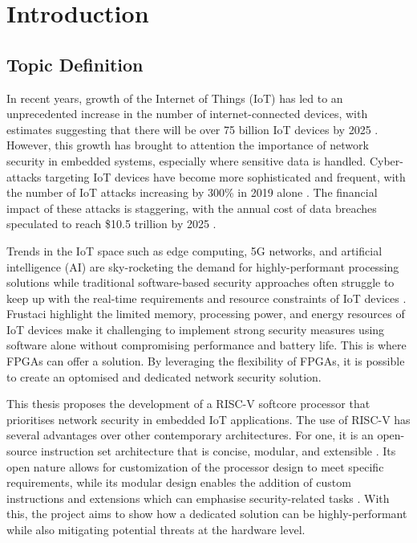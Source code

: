 \chapter[Introduction]{Introduction}
\label{Chap:Introduction}

\section{Topic Definition}
In recent years, growth of the Internet of Things (IoT) has led to an unprecedented increase in the number of internet-connected devices, with estimates suggesting that there will be over 75 billion IoT devices by 2025 \cite{Alam2018}. However, this growth has brought to attention the importance of network security in embedded systems, especially where sensitive data is handled. Cyber-attacks targeting IoT devices have become more sophisticated and frequent, with the number of IoT attacks increasing by 300\% in 2019 alone \cite{Michael2019}. The financial impact of these attacks is staggering, with the annual cost of data breaches speculated to reach \$10.5 trillion by 2025 \cite{Morgan2020}. 

Trends in the IoT space such as edge computing, 5G networks, and artificial intelligence (AI) are sky-rocketing the demand for highly-performant processing solutions \cite{Nuttall2018} while traditional software-based security approaches often struggle to keep up with the real-time requirements and resource constraints of IoT devices \cite{Frustaci2018}. Frustaci \etal \cite{Frustaci2018} highlight the limited memory, processing power, and energy resources of IoT devices make it challenging to implement strong security measures using software alone without compromising performance and battery life. This is where FPGAs can offer a solution. By leveraging the flexibility of FPGAs, it is possible to create an optomised and dedicated network security solution.

This thesis proposes the development of a RISC-V softcore processor that prioritises network security in embedded IoT applications. The use of RISC-V has several advantages over other contemporary architectures. For one, it is an open-source instruction set architecture that is concise, modular, and extensible \cite{Patterson2017}. Its open nature allows for customization of the processor design to meet specific requirements, while its modular design enables the addition of custom instructions and extensions which can emphasise security-related tasks \cite{Waterman2016}. With this, the project aims to show how a dedicated solution can be highly-performant while also mitigating potential threats at the hardware level.

